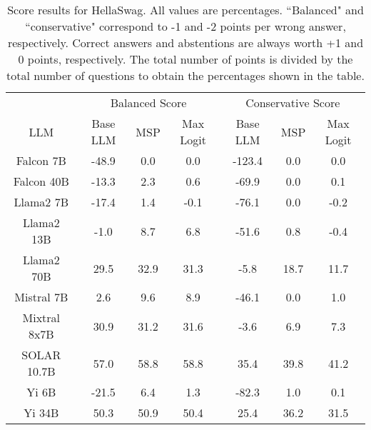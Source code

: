 \begin{table*}
\centering
\begin{tabular}{c|c|c|c|c|c|c}
& \multicolumn{3}{c|}{Balanced Score} & \multicolumn{3}{c}{Conservative Score} \\ 
LLM & Base LLM & MSP & Max Logit & Base LLM & MSP & Max Logit\\ \hline
Falcon 7B & -48.9 & 0.0 & 0.0 & -123.4 & 0.0 & 0.0\\
Falcon 40B & -13.3 & 2.3 & 0.6 & -69.9 & 0.0 & 0.1\\
Llama2 7B & -17.4 & 1.4 & -0.1 & -76.1 & 0.0 & -0.2\\
Llama2 13B & -1.0 & 8.7 & 6.8 & -51.6 & 0.8 & -0.4\\
Llama2 70B & 29.5 & 32.9 & 31.3 & -5.8 & 18.7 & 11.7\\
Mistral 7B & 2.6 & 9.6 & 8.9 & -46.1 & 0.0 & 1.0\\
Mixtral 8x7B & 30.9 & 31.2 & 31.6 & -3.6 & 6.9 & 7.3\\
SOLAR 10.7B & 57.0 & 58.8 & 58.8 & 35.4 & 39.8 & 41.2\\
Yi 6B & -21.5 & 6.4 & 1.3 & -82.3 & 1.0 & 0.1\\
Yi 34B & 50.3 & 50.9 & 50.4 & 25.4 & 36.2 & 31.5\\
\hline
\end{tabular}
\caption{Score results for HellaSwag. All values are percentages. ``Balanced" and ``conservative" correspond to -1 and -2 points per wrong answer, respectively. Correct answers and abstentions are always worth +1 and 0 points, respectively. The total number of points is divided by the total number of questions to obtain the percentages shown in the table.}
\label{tab:hellaswag_score}
\end{table*}
